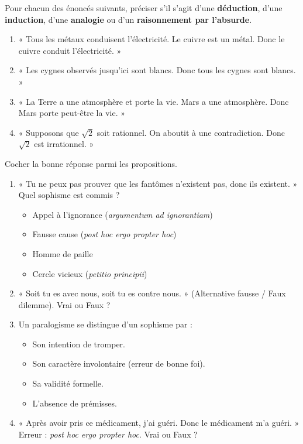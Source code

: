 \documentclass[11pt]{article}
\begin{document}
\begin{exercice}
Pour chacun des énoncés suivants, préciser s'il s'agit d'une \textbf{déduction}, d'une \textbf{induction}, d'une \textbf{analogie} ou d'un \textbf{raisonnement par l'absurde}.
\begin{enumerate}
    \item « Tous les métaux conduisent l'électricité. Le cuivre est un métal. Donc le cuivre conduit l'électricité. »
    \item « Les cygnes observés jusqu'ici sont blancs. Donc tous les cygnes sont blancs. »
    \item « La Terre a une atmosphère et porte la vie. Mars a une atmosphère. Donc Mars porte peut-être la vie. »
    \item « Supposons que $\sqrt{2}$ soit rationnel. On aboutit à une contradiction. Donc $\sqrt{2}$ est irrationnel. »
\end{enumerate}
\end{exercice}

\begin{exercice}
Cocher la bonne réponse parmi les propositions.
\begin{enumerate}
    \item « Tu ne peux pas prouver que les fantômes n'existent pas, donc ils existent. » Quel sophisme est commis ?
\begin{itemize}
        \item [$\square$] Appel à l'ignorance (\textit{argumentum ad ignorantiam})
        \item [$\square$] Fausse cause (\textit{post hoc ergo propter hoc})
        \item [$\square$] Homme de paille
        \item [$\square$] Cercle vicieux (\textit{petitio principii})
    \end{itemize}
    \item « Soit tu es avec nous, soit tu es contre nous. » (Alternative fausse / Faux dilemme). Vrai ou Faux ?
    \item Un paralogisme se distingue d'un sophisme par :
\begin{itemize}
        \item [$\square$] Son intention de tromper.
        \item [$\square$] Son caractère involontaire (erreur de bonne foi).
        \item [$\square$] Sa validité formelle.
        \item [$\square$] L'absence de prémisses.
    \end{itemize}
    \item « Après avoir pris ce médicament, j'ai guéri. Donc le médicament m'a guéri. » Erreur : \textit{post hoc ergo propter hoc}. Vrai ou Faux ?
\end{enumerate}
\end{exercice}
\end{document}
